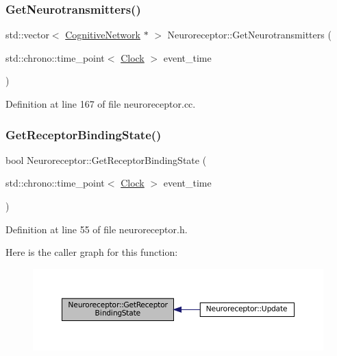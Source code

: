 \subsubsection{\texorpdfstring{Get\+Neurotransmitters()}{GetNeurotransmitters()}}
{\footnotesize\ttfamily std\+::vector$<$ \mbox{\hyperlink{class_cognitive_network}{Cognitive\+Network}} $\ast$ $>$ Neuroreceptor\+::\+Get\+Neurotransmitters (\begin{DoxyParamCaption}\item[{std\+::chrono\+::time\+\_\+point$<$ \mbox{\hyperlink{universe_8h_a0ef8d951d1ca5ab3cfaf7ab4c7a6fd80}{Clock}} $>$}]{event\+\_\+time }\end{DoxyParamCaption})}



Definition at line 167 of file neuroreceptor.\+cc.

\mbox{\label{class_neuroreceptor_afbcf31596170f09292e4d8057c0215e8}} 
\subsubsection{\texorpdfstring{Get\+Receptor\+Binding\+State()}{GetReceptorBindingState()}}
{\footnotesize\ttfamily bool Neuroreceptor\+::\+Get\+Receptor\+Binding\+State (\begin{DoxyParamCaption}\item[{std\+::chrono\+::time\+\_\+point$<$ \mbox{\hyperlink{universe_8h_a0ef8d951d1ca5ab3cfaf7ab4c7a6fd80}{Clock}} $>$}]{event\+\_\+time }\end{DoxyParamCaption})\hspace{0.3cm}{\ttfamily [inline]}}



Definition at line 55 of file neuroreceptor.\+h.

Here is the caller graph for this function\+:\nopagebreak
\begin{figure}[H]
\begin{center}
\leavevmode
\includegraphics[width=350pt]{class_neuroreceptor_afbcf31596170f09292e4d8057c0215e8_icgraph}
\end{center}
\end{figure}
\mbox{\label{class_neuroreceptor_a3ef0065a7670a2c156e34851140e0fa8}} 
